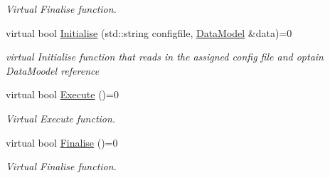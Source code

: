 \begin{DoxyCompactItemize}
\begin{DoxyCompactList}\small\item\em Virtual Finalise function. \end{DoxyCompactList}\item 
virtual bool \hyperlink{classTool_a4b04a99172dfe09dc97927d1feaff0ce}{Initialise} (std\-::string configfile, \hyperlink{classDataModel}{Data\-Model} \&data)=0
\begin{DoxyCompactList}\small\item\em virtual Initialise function that reads in the assigned config file and optain Data\-Moodel reference \end{DoxyCompactList}\item 
\hypertarget{classTool_a6a71469fa4efffd6fb71afbd4941e49d}{virtual bool \hyperlink{classTool_a6a71469fa4efffd6fb71afbd4941e49d}{Execute} ()=0}\label{classTool_a6a71469fa4efffd6fb71afbd4941e49d}

\begin{DoxyCompactList}\small\item\em Virtual Execute function. \end{DoxyCompactList}\item 
\hypertarget{classTool_a1f9a82fe5cc9afd63fc8eb3aaf5d80ca}{virtual bool \hyperlink{classTool_a1f9a82fe5cc9afd63fc8eb3aaf5d80ca}{Finalise} ()=0}\label{classTool_a1f9a82fe5cc9afd63fc8eb3aaf5d80ca}

\begin{DoxyCompactList}\small\item\em Virtual Finalise function. \end{DoxyCompactList}\end{DoxyCompactItemize}
